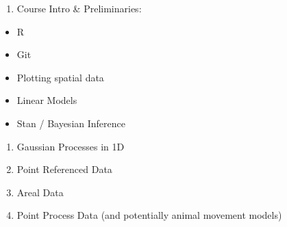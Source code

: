 \documentclass[11pt,]{article}
\providecommand{\tightlist}{%
  \setlength{\itemsep}{0pt}\setlength{\parskip}{0pt}}
\begin{document}
\begin{enumerate}
\def\labelenumi{\arabic{enumi}.}
\tightlist
\item
  Course Intro \& Preliminaries:
\end{enumerate}

\begin{itemize}
\tightlist
\item
  R
\item
  Git
\item
  Plotting spatial data
\item
  Linear Models
\item
  Stan / Bayesian Inference
\end{itemize}

\begin{enumerate}
\def\labelenumi{\arabic{enumi}.}
\setcounter{enumi}{1}
\tightlist
\item
  Gaussian Processes in 1D
\item
  Point Referenced Data
\item
  Areal Data
\item
  Point Process Data (and potentially animal movement models)
\end{enumerate}
\end{document}
